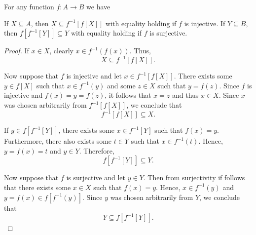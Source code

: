 \begin{proposition}\label{thm:function_image_preimage_composition}
  For any function \( f: A \to B \) we have
  \begin{thmenum}
     If \( X \subseteq A \), then \( X \subseteq f^{-1}[f[X]] \) with equality holding if \( f \) is injective.
     If \( Y \subseteq B \), then \( f[f^{-1}[Y]] \subseteq Y \) with equality holding if \( f \) is surjective.
  \end{thmenum}
\end{proposition}
\begin{proof}
   If \( x \in X \), clearly \( x \in f^{-1}(f(x)) \). Thus,
  \begin{equation*}
    X \subseteq f^{-1}[f[X]].
  \end{equation*}

  Now suppose that \( f \) is injective and let \( x \in f^{-1}[f[X]] \). There exists some \( y \in f[X] \) such that \( x \in f^{-1}(y) \) and some \( z \in X \) such that \( y = f(z) \). Since \( f \) is injective and \( f(x) = y = f(z) \), it follows that \( x = z \) and thus \( x \in X \). Since \( x \) was chosen arbitrarily from \( f^{-1}[f[X]] \), we conclude that
  \begin{equation*}
    f^{-1}[f[X]] \subseteq X.
  \end{equation*}

   If \( y \in f[f^{-1}[Y]] \), there exists some \( x \in f^{-1}[Y] \) such that \( f(x) = y \). Furthermore, there also exists some \( t \in Y \) such that \( x \in f^{-1}(t) \). Hence, \( y = f(x) = t \) and \( y \in Y \). Therefore,
  \begin{equation*}
    f[f^{-1}[Y]] \subseteq Y.
  \end{equation*}

  Now suppose that \( f \) is surjective and let \( y \in Y \). Then from surjectivity if follows that there exists some \( x \in X \) such that \( f(x) = y \). Hence, \( x \in f^{-1}(y) \) and \( y = f(x) \in f[f^{-1}(y)] \). Since \( y \) was chosen arbitrarily from \( Y \), we conclude that
  \begin{equation*}
    Y \subseteq f[f^{-1}[Y]].
  \end{equation*}
\end{proof}

